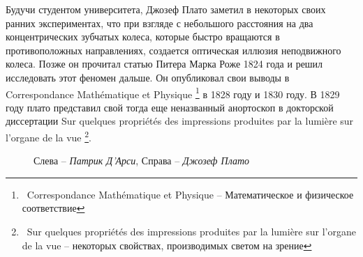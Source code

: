 \documentclass[a4paper, 12pt]{article}
\begin{document}
Будучи студентом университета, Джозеф Плато заметил в
некоторых своих ранних экспериментах, что при взгляде с небольшого
расстояния на два концентрических зубчатых колеса, которые быстро
вращаются в противоположных направлениях, создается оптическая
иллюзия неподвижного колеса. Позже он прочитал статью Питера
Марка Роже 1824 года и решил исследовать этот феномен дальше. Он
опубликовал свои выводы в Correspondance Mathématique et Physique
\footnote{\ Correspondance Mathématique et Physique -- Математическое и физическое соответствие}
в 1828 году и 1830 году. В 1829 году плато представил свой тогда еще
неназванный анортоскоп в докторской диссертации Sur quelques
propriétés des impressions produites par la lumière sur l'organe de la vue
\footnote{\ Sur quelques
	propriétés des impressions produites par la lumière sur l'organe de la vue --
	некоторых свойствах, производимых светом на зрение}.

\begin{figure}[ht]
	\caption{Слева -- \textit{Патрик Д'Арси}, Справа -- \textit{Джозеф Плато}}
\end{figure}
\end{document}
